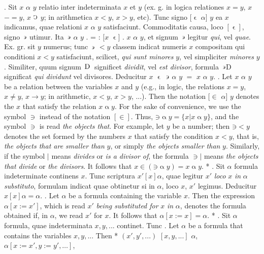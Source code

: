 \documentclass{book}
\newcommand{\C}{\mathop{\sbox0{$\displaystyle$$\reflectbox{C}$} %
\raisebox{-\height+\ht0-0.05cm}[\ht0][\dp0]{\scalebox{0.8}[0.8]{\copy0}}}\displaylimits} %
\newcommand{\such}{\thinspace \rotatebox[origin=c]{180}{$\epsilon$}}
\newcommand{\smallIn}{\ensuremath{\mathrel{\epsilon}}}
\newcommand{\D}{\mathop{\thinspace \text{D} \thinspace}}
\newenvironment{translateTwoCol}
               { %
                 \columnratio{0.5, 0.5}
                 \begin{paracol}{2}
                 \newcommand{\LAT}{\switchcolumn[0]*}
                 \newcommand{\ENG}{\switchcolumn[1]}
               }
               { %
                 \let\ENG\undefined
                 \let\LAT\undefined
                 \end{paracol}
               }
\begin{document}
\begin{translateTwoCol}
. Sit $x$ $\alpha$ $y$ relatio inter indeterminata $x$ et $y$ (ex. g. in logica relationes $x = y$, $x$ $- = y$, $x$ $\C$ $y$; in arithmetica $x < y$, $x > y$, etc). Tunc signo $[\smallIn$ $\alpha]$ $y$ ea $x$ indicamus, quae relationi $x$ $\alpha$ $y$ satisfaciunt. Commoditatis causa, loco $[\smallIn]$, signo $\such$ utimur. Ita $\such$ $\alpha$ $y$ . = : $[x$ $\smallIn ]$ . $x$ $\alpha$ $y$, et signum $\such$ legitur \emph{qui}, vel \emph{quae}. Ex. gr. sit $y$ numerus; tunc $\such$ $< y$ classem indicat numeris $x$ compositam qui conditioni $x<y$ satisfaciunt, scilicet, \emph{qui sunt minores} $y$, vel simpliciter \emph{minores} $y$. Similiter, quum signum $\D$ significet \emph{dividit}, vel \emph{est divisor}, formula $\such$D significat \emph{qui dividunt} vel {divisores}. Deducitur $x$ $\smallIn$ $\such$ $\alpha$ $y$ $=$ $x$ $\alpha$ $y$.
\ENG
{}. Let $x$ $\alpha$ $y$ be a relation between the variables $x$ and $y$ (e.g., in logic, the relations $x = y$, $x \not= y$, $x \rightarrow y$; in arithmetic, $x < y$, $x > y$, ...). Then the notation $[\in$ $\alpha]$ $y$ denotes the $x$ that satisfy the relation $x \mathbin{\alpha} y$. For the sake of convenience, we use the symbol $\ni$ instead of the notation $[\in]$. Thus, $\mathord{\ni} \mathbin{\alpha} y = \{ x | x \mathbin{\alpha} y \}$, and the symbol $\ni$ is read \emph{the objects that}. For example, let $y$ be a number; then $\mathord{\ni} < y$ denotes the set formed by the numbers $x$ that satisfy the condition $x<y$, that is, \emph{the objects that are smaller than} $y$, or simply \emph{the objects smaller than} $y$. Similarly, if the symbol $|$ means \emph{divides} or \emph{is a divisor of}, the formula $\ni|$ means \emph{the objects that divide} or \emph{the divisors}. It follows that $x \in (\mathord{\ni} \mathbin{\alpha} y) = x \mathbin{\alpha} y$.   %
\LAT
{}. Sit $\alpha$ formula indeterminate continens $x$. Tunc scriptura $x' [x] \alpha$, quae legitur $x'$ \emph{loco} $x$ \emph{in} $\alpha$ \emph{substituto}, formulam indicat quae obtinetur si in $\alpha$, loco $x$, $x'$ legimus. Deducitur $x [x] \alpha = \alpha$.
\ENG
{}. Let $\alpha$ be a formula containing the variable $x$. Then the expression $\alpha [ x := x' ]$, which is read $x'$ \emph{being substituted for} $x$ \emph{in} $\alpha$, denotes the formula obtained if, in $\alpha$, we read $x'$ for $x$. It follows that $\alpha[x := x] = \alpha$.
\LAT
{}. Sit $\alpha$ formula, quae indeterminata $x,y,...$ continet. Tunc
\ENG
{}. Let $\alpha$ be a formula that contains the variables $x,y,...$ Then
\LAT
\hspace{1.06cm} $(x',y',...)$ $[x,y,...]$ $\alpha$,
\ENG
\hspace{1.06cm} $\alpha[x:=x', y:=y', \ldots]$,
\end{translateTwoCol}
\end{document}
